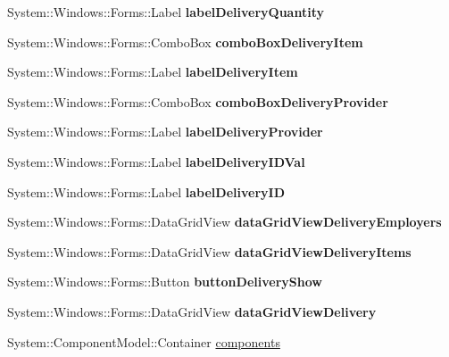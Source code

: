 \begin{DoxyCompactItemize}
\hypertarget{class_magazyn_1_1_magazin_a1bf0a416536c17bd818d2f917e21857d}{}\label{class_magazyn_1_1_magazin_a1bf0a416536c17bd818d2f917e21857d} 
System\+::\+Windows\+::\+Forms\+::\+Label {\bfseries label\+Delivery\+Quantity}
\item 
\hypertarget{class_magazyn_1_1_magazin_a9442cbb0683fb57a0f5d709e77a3d03f}{}\label{class_magazyn_1_1_magazin_a9442cbb0683fb57a0f5d709e77a3d03f} 
System\+::\+Windows\+::\+Forms\+::\+Combo\+Box {\bfseries combo\+Box\+Delivery\+Item}
\item 
\hypertarget{class_magazyn_1_1_magazin_a742c436dde4a33b6aa6352bf7bd7626e}{}\label{class_magazyn_1_1_magazin_a742c436dde4a33b6aa6352bf7bd7626e} 
System\+::\+Windows\+::\+Forms\+::\+Label {\bfseries label\+Delivery\+Item}
\item 
\hypertarget{class_magazyn_1_1_magazin_ab1f0127c2bebc0e43fa98f9318efd773}{}\label{class_magazyn_1_1_magazin_ab1f0127c2bebc0e43fa98f9318efd773} 
System\+::\+Windows\+::\+Forms\+::\+Combo\+Box {\bfseries combo\+Box\+Delivery\+Provider}
\item 
\hypertarget{class_magazyn_1_1_magazin_a8131c975c8732a7f0f960cf053293bea}{}\label{class_magazyn_1_1_magazin_a8131c975c8732a7f0f960cf053293bea} 
System\+::\+Windows\+::\+Forms\+::\+Label {\bfseries label\+Delivery\+Provider}
\item 
\hypertarget{class_magazyn_1_1_magazin_af77f7189613d6aa982db5ac12a394083}{}\label{class_magazyn_1_1_magazin_af77f7189613d6aa982db5ac12a394083} 
System\+::\+Windows\+::\+Forms\+::\+Label {\bfseries label\+Delivery\+I\+D\+Val}
\item 
\hypertarget{class_magazyn_1_1_magazin_a8e2c6616ac746034b531bc3514053b04}{}\label{class_magazyn_1_1_magazin_a8e2c6616ac746034b531bc3514053b04} 
System\+::\+Windows\+::\+Forms\+::\+Label {\bfseries label\+Delivery\+ID}
\item 
\hypertarget{class_magazyn_1_1_magazin_a6337a163dc4c04b301f8243099779237}{}\label{class_magazyn_1_1_magazin_a6337a163dc4c04b301f8243099779237} 
System\+::\+Windows\+::\+Forms\+::\+Data\+Grid\+View {\bfseries data\+Grid\+View\+Delivery\+Employers}
\item 
\hypertarget{class_magazyn_1_1_magazin_ab95376152497c0286f43fe7cf6d8edb2}{}\label{class_magazyn_1_1_magazin_ab95376152497c0286f43fe7cf6d8edb2} 
System\+::\+Windows\+::\+Forms\+::\+Data\+Grid\+View {\bfseries data\+Grid\+View\+Delivery\+Items}
\item 
\hypertarget{class_magazyn_1_1_magazin_a3728e27869f8b7d93bb9b9c6e7e5f542}{}\label{class_magazyn_1_1_magazin_a3728e27869f8b7d93bb9b9c6e7e5f542} 
System\+::\+Windows\+::\+Forms\+::\+Button {\bfseries button\+Delivery\+Show}
\item 
\hypertarget{class_magazyn_1_1_magazin_a20c5ca3b17de48479df84e55ab1bf4ee}{}\label{class_magazyn_1_1_magazin_a20c5ca3b17de48479df84e55ab1bf4ee} 
System\+::\+Windows\+::\+Forms\+::\+Data\+Grid\+View {\bfseries data\+Grid\+View\+Delivery}
\item 
System\+::\+Component\+Model\+::\+Container \hyperlink{class_magazyn_1_1_magazin_afa865a4ec66de6ca82ca6f1d3abf3c80}{components}
\end{DoxyCompactItemize}


